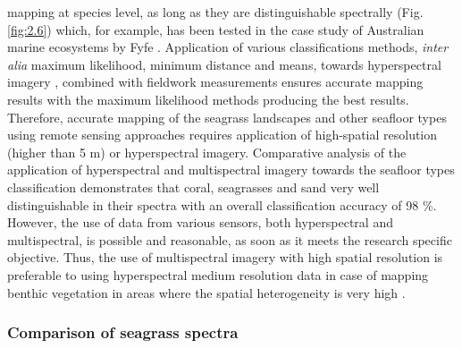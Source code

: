 \documentclass[11pt]{article}
\begin{document}
mapping at species level, as long as they are distinguishable spectrally (Fig.\ref{fig:2.6}) which, for example, has been
tested in the case study of Australian marine ecosystems by Fyfe \cite{Fyfe04}\label{Fyfe04}. 
Application of various classifications methods, \textit{inter alia} maximum likelihood, minimum distance and means, towards
hyperspectral imagery \cite{Peneva08}\label{Peneva08}, combined with fieldwork measurements ensures accurate
mapping results with the maximum likelihood methods producing the best results. 
Therefore, accurate mapping of the seagrass landscapes and other seafloor types using remote sensing
approaches requires application of high-spatial resolution (higher than 5 m) or hyperspectral imagery.
Comparative analysis of the application of hyperspectral\label{sec:2.4.2} and multispectral imagery towards the
seafloor types classification \cite{Hochberg03a}\label{Hochberg03a} demonstrates that coral, seagrasses and
sand very well distinguishable in their spectra with an overall classification accuracy of 98 \%.
However, the use of data from various sensors, both hyperspectral and multispectral, is possible and
reasonable, as soon as it meets the research specific objective. 
Thus, the use of multispectral imagery
with high spatial resolution is preferable to using hyperspectral medium resolution data in case of
mapping benthic vegetation in areas where the spatial heterogeneity is very high \cite{Vahtmae07}\label{Vahtmae07}.

\subsubsection[Comparison of seagrass spectra]{Comparison of seagrass spectra}\label{sec:2.5.3}
\end{document}
